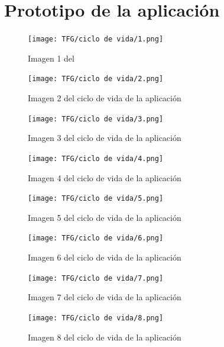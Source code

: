 \documentclass{article}
\begin{document}
\section{Prototipo de la aplicación}

\begin{figure}[h!]
    \centering
    \texttt{[image: TFG/ciclo de vida/1.png]}
    \caption{Imagen 1 del }
\end{figure}

\begin{figure}[h!]
    \centering
    \texttt{[image: TFG/ciclo de vida/2.png]}
    \caption{Imagen 2 del ciclo de vida de la aplicación}
\end{figure}

\begin{figure}[h!]
    \centering
    \texttt{[image: TFG/ciclo de vida/3.png]}
    \caption{Imagen 3 del ciclo de vida de la aplicación}
\end{figure}



\begin{figure}[h!]
    \centering
    \texttt{[image: TFG/ciclo de vida/4.png]}
    \caption{Imagen 4 del ciclo de vida de la aplicación}
\end{figure}

\begin{figure}[h!]
    \centering
    \texttt{[image: TFG/ciclo de vida/5.png]}
    \caption{Imagen 5 del ciclo de vida de la aplicación}
\end{figure}

\begin{figure}[h!]
    \centering
    \texttt{[image: TFG/ciclo de vida/6.png]}
    \caption{Imagen 6 del ciclo de vida de la aplicación}
\end{figure}

\begin{figure}[h!]
    \centering
    \texttt{[image: TFG/ciclo de vida/7.png]}
    \caption{Imagen 7 del ciclo de vida de la aplicación}
\end{figure}

\begin{figure}[h!]
    \centering
    \texttt{[image: TFG/ciclo de vida/8.png]}
    \caption{Imagen 8 del ciclo de vida de la aplicación}
\end{figure}

\end{document}
